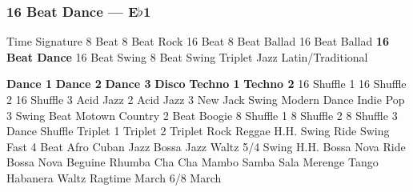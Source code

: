 \subsubsection[16 Beat Dance]{16 Beat Dance --- \UiKey{\II}\UiKey{\MET}E$\flat$1}
Time Signature
8 Beat
8 Beat Rock
16 Beat
8 Beat Ballad
16 Beat Ballad
\textbf{16 Beat Dance}
16 Beat Swing
8 Beat Swing
Triplet
Jazz
Latin/Traditional





























\textbf{Dance 1}
\textbf{Dance 2}
\textbf{Dance 3}
\textbf{Disco}
\textbf{Techno 1}
\textbf{Techno 2}
16 Shuffle 1
16 Shuffle 2
16 Shuffle 3
Acid Jazz 2
Acid Jazz 3
New Jack Swing
Modern Dance
Indie Pop 3
Swing Beat
Motown
Country 2 Beat
Boogie
8 Shuffle 1
8 Shuffle 2
8 Shuffle 3
Dance Shuffle
Triplet 1
Triplet 2
Triplet Rock
Reggae
H.H. Swing
Ride Swing
Fast 4 Beat
Afro Cuban
Jazz Bossa
Jazz Waltz
5/4 Swing
H.H. Bossa Nova
Ride Bossa Nova
Beguine
Rhumba
Cha Cha
Mambo
Samba
Sala
Merenge
Tango
Habanera
Waltz
Ragtime
March
6/8 March
